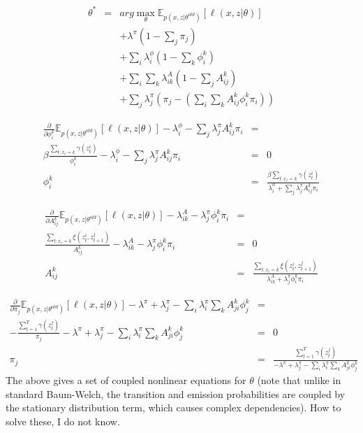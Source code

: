 \documentclass[11pt]{article}
\begin{document}
\begin{eqnarray*}
\theta^* & = & arg \max_\theta \mathbb{E}_{p(x,z|\theta^{old})}[\ell(x,z|\theta)] \\
& & + \lambda^\pi \left(1 - \sum_j \pi_j \right) \\
& & + \sum_i\lambda^\phi_i \left(1 - \sum_k\phi_i^k\right) \\
& & + \sum_i\sum_k\lambda^A_{ik}\left(1-\sum_j A^k_{ij}\right) \\
& & + \sum_j \lambda^\pi_j\left(\pi_j - \left(\sum_i \sum_k A^k_{ij}\phi^k_i\pi_i\right)\right)
\end{eqnarray*}

\begin{eqnarray*}
\frac{\partial}{\partial\phi^k_i} \mathbb{E}_{p(x,z|\theta^{old})}[\ell(x,z|\theta)] - \lambda^\phi_i - \sum_j \lambda^\pi_j A^k_{ij}\pi_i & = & \\
\beta \frac{\sum_{t:x_t = k}\gamma(z_t^i)}{\phi_i^k}  - \lambda^\phi_i  - \sum_j \lambda^\pi_j A^k_{ij}\pi_i & = & 0 \\
\phi^k_i & = & \frac{\beta \sum_{t:x_t = k} \gamma(z_t^i)}{\lambda^\phi_i + \sum_j \lambda^\pi_j A^k_{ij}\pi_i}
\end{eqnarray*}

\begin{eqnarray*}
\frac{\partial}{\partial A^k_{ij}} \mathbb{E}_{p(x,z|\theta^{old})}[\ell(x,z|\theta)] - \lambda^A_{ik} - \lambda^\pi_j \phi^k_i\pi_i & = & \\
\frac{\sum_{t:x_t=k}\xi(z_t^i,z_{t+1}^j)}{A^k_{ij}} - \lambda^A_{ik} - \lambda^\pi_j \phi^k_i\pi_i & = & 0 \\
A^k_{ij} & = & \frac{\sum_{t:x_t=k}\xi(z^i_t,z^j_{t+1})}{\lambda^A_{ik} + \lambda^\pi_j \phi^k_i \pi_i}
\end{eqnarray*}

\begin{eqnarray*}
\frac{\partial}{\partial \pi_j} \mathbb{E}_{p(x,z|\theta^{old})}[\ell(x,z|\theta)] - \lambda^\pi + \lambda^\pi_j - \sum_i \lambda^\pi_i\sum_k A^k_{ji}\phi^k_j & = & \\
- \frac{\sum_{t=1}^T\gamma(z^j_t)}{\pi_j} - \lambda^\pi + \lambda^\pi_j - \sum_i \lambda^\pi_i\sum_k A^k_{ji}\phi^k_j & = & 0 \\
\pi_j & = & \frac{\sum_{t=1}^T \gamma(z_t^j)}{-\lambda^\pi + \lambda^\pi_j - \sum_i\lambda^\pi_i \sum_k A^k_{ji}\phi^k_j}
\end{eqnarray*}
The above gives a set of coupled nonlinear equations for $\theta$ (note that unlike in standard Baum-Welch, the transition and emission probabilities are coupled by the stationary distribution term, which causes complex dependencies).  How to solve these, I do not know.
\end{document}
